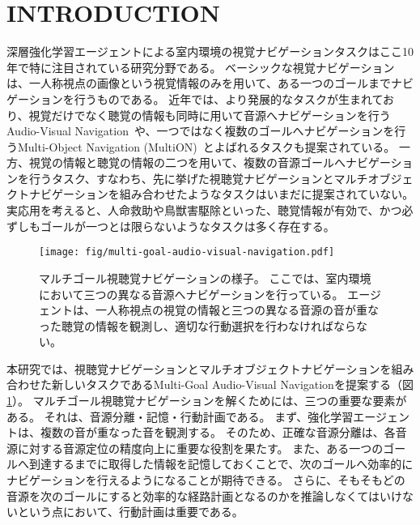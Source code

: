 \section{INTRODUCTION}

深層強化学習エージェントによる室内環境の視覚ナビゲーションタスクはここ10年で特に注目されている研究分野である。
ベーシックな視覚ナビゲーションは、一人称視点の画像という視覚情報のみを用いて、ある一つのゴールまでナビゲーションを行うものである。
近年では、より発展的なタスクが生まれており、視覚だけでなく聴覚の情報も同時に用いて音源へナビゲーションを行うAudio-Visual Navigation~\cite{chen2020soundspaces}や、一つではなく複数のゴールへナビゲーションを行うMulti-Object Navigation (MultiON)~\cite{wani2020multion}とよばれるタスクも提案されている。
一方、視覚の情報と聴覚の情報の二つを用いて、複数の音源ゴールへナビゲーションを行うタスク、すなわち、先に挙げた視聴覚ナビゲーションとマルチオブジェクトナビゲーションを組み合わせたようなタスクはいまだに提案されていない。
実応用を考えると、人命救助や鳥獣害駆除といった、聴覚情報が有効で、かつ必ずしもゴールが一つとは限らないようなタスクは多く存在する。

\begin{figure}[t]
    \begin{center}
        \centering
        \texttt{[image: fig/multi-goal-audio-visual-navigation.pdf]}
        \caption{
            マルチゴール視聴覚ナビゲーションの様子。
            ここでは、室内環境において三つの異なる音源へナビゲーションを行っている。
            エージェントは、一人称視点の視覚の情報と三つの異なる音源の音が重なった聴覚の情報を観測し、適切な行動選択を行わなければならない。
        }
        \label{fig:multi_goal_av_nav}
    \end{center}
\end{figure}

本研究では、視聴覚ナビゲーションとマルチオブジェクトナビゲーションを組み合わせた新しいタスクであるMulti-Goal Audio-Visual Navigationを提案する（図\ref{fig:multi_goal_av_nav}）。
マルチゴール視聴覚ナビゲーションを解くためには、三つの重要な要素がある。
それは、音源分離・記憶・行動計画である。
まず、強化学習エージェントは、複数の音が重なった音を観測する。
そのため、正確な音源分離は、各音源に対する音源定位の精度向上に重要な役割を果たす。
また、ある一つのゴールへ到達するまでに取得した情報を記憶しておくことで、次のゴールへ効率的にナビゲーションを行えるようになることが期待できる。
さらに、そもそもどの音源を次のゴールにすると効率的な経路計画となるのかを推論しなくてはいけないという点において、行動計画は重要である。

